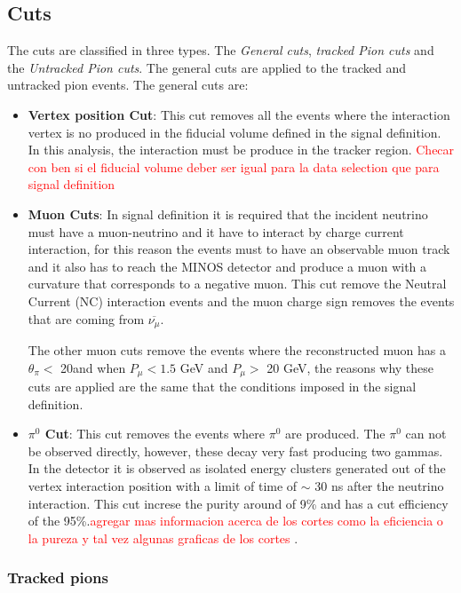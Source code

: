 \subsection{Cuts}
\label{Cap:Analysis:DataSelection:Cuts}

The cuts are classified in three types. The \textit{General cuts}, \textit{tracked Pion cuts} and the \textit{Untracked Pion cuts}. The general cuts are applied to the tracked and untracked pion events. The general cuts are:

\begin{itemize}
    \item \textbf{Vertex position Cut}: This cut removes all the events where the interaction vertex is no produced in the fiducial volume defined in the signal definition. In this analysis, the interaction must be produce in the tracker region. \textcolor{red}{Checar con ben si el fiducial volume deber ser igual para la data selection que para signal definition}
    \item \textbf{Muon Cuts}: In signal definition it is required that the incident neutrino must have a muon-neutrino and it have to interact by charge current interaction, for this reason the events must to have an observable muon track and it also has to reach the MINOS detector and produce a muon with a curvature that corresponds to a negative muon. This cut remove the Neutral Current (NC) interaction events and the muon charge sign removes the events that are coming from $\overline{\nu_\mu}$. 
    
    The other muon cuts remove the events where the reconstructed muon has a $\theta_\pi<$ 20\textdegree and when $P_\mu < 1.5$ GeV and $P_\mu>$ 20 GeV, the reasons why these cuts are applied are the same that the conditions imposed in the signal definition.  
    \item \textbf{$\pi^0$ Cut}: This cut removes the events where $\pi^0$ are produced. The $\pi^0$ can not be observed directly, however, these decay very fast producing two gammas. In the detector it is observed as isolated energy clusters generated out of the vertex interaction position with a limit of time of \(\sim\) 30 ns after the neutrino interaction. This cut increse the purity around of 9\% and has a cut efficiency of the 95\%.\textcolor{red}{agregar mas informacion acerca de los cortes como la eficiencia o la pureza y tal vez algunas graficas de los cortes
    }. 
\end{itemize}


\subsubsection{Tracked pions}
\label{Cap:Analysis:DataSelection:Cuts:Tracked}

